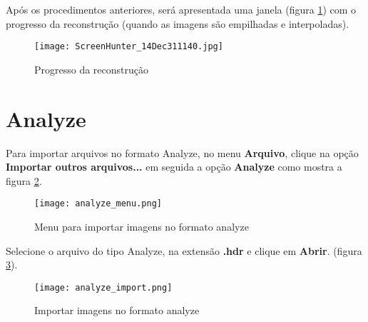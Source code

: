 Após os procedimentos anteriores, será apresentada uma janela (figura \ref{fig:prog_recons}) com o progresso
da reconstrução (quando as imagens são empilhadas e interpoladas).

\begin{figure}[!htb]
\centering
\texttt{[image: ScreenHunter\_14Dec311140.jpg]}
\caption{Progresso da reconstrução}
\label{fig:prog_recons}
\end{figure}

\newpage

\section{Analyze}

Para importar arquivos no formato Analyze, no menu \textbf{Arquivo}, clique na opção \textbf{Importar outros arquivos...} em seguida a opção \textbf{Analyze} como mostra a figura \ref{fig:analyze_menu}.

\begin{figure}[!htb]
\centering
\texttt{[image: analyze\_menu.png]}
\caption{Menu para importar imagens no formato analyze}
\label{fig:analyze_menu}
\end{figure}

Selecione o arquivo do tipo Analyze, na extensão \textbf{.hdr} e clique em \textbf{Abrir}. (figura \ref{fig:analyze_import}).

\begin{figure}[!htb]
\centering
\texttt{[image: analyze\_import.png]}
\caption{Importar imagens no formato analyze}
\label{fig:analyze_import}
\end{figure}